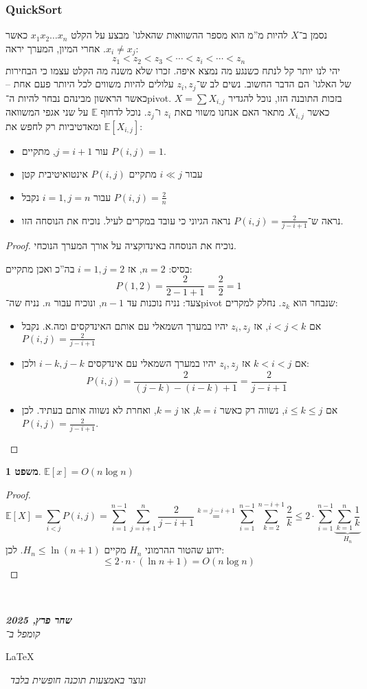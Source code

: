 \documentclass[]{article}
\newcommand\en[1] {\begin{otherlanguage}{english}#1\end{otherlanguage}}
\newcommand\ndoc  {\dotfill \\ \vfil {\begin{center}
            {\textbf{\textit{שחר פרץ, 2025}} \\
                \scriptsize \textit{קומפל ב־}\en{\LaTeX}\,\textit{ ונוצר באמצעות תוכנה חופשית בלבד}}
    \end{center}} \vfil	}
\newcommand\E     {\mathbb{E}}
\newcommand\logn  {\log n}
\newtheorem{Theorem}{משפט}
\theoremstyle{definition}
\newcommand\theo  [1] {\begin{Theorem}#1\end{Theorem}}
\begin{document}
    \subsubsection*{QuickSort}
    נסמן ב־$X$ להיות מ''מ הוא מספר ההשוואות שהאלגו' מבצע על הקלט $x_1x_2 \dots x_n$ כאשר $x_i \neq x_j$. אחרי המיון, המערך יראה: 
    \[ z_1 < z_2 < z_3 < \cdots < z_i < \cdots < z_n \]
    יהי לנו יותר קל לנתח כשנגע מה נמצא איפה. זכרו שלא משנה מה הקלט עצמו כי הבחירות של האלגו' הם הדבר החשוב. נשים לב ש־$z_i, z_j$ עלולים להיות משווים לכל היותר פעם אחת – כאשר הראשון מבינהם נבחר להיות ה־pivot. בזכות התובנה הזו, נוכל להגדיר $X = \sum X_{i, j}$ כאשר $X_{i, j}$ מתאר האם אנחנו משווי םאת $z_i$ ו־$z_j$. נוכל לדחוף $\E$ על שני אגפי המשוואה ומאדטיביות רק לחפש את $\E[X_{i, j}]$: 
    \begin{itemize}
        \item עור $j = i + 1$, מתקיים $P(i, j) = 1$. 
        \item עבור $i \ll j$ מתקיים $P(i, j)$ אינטואיטיבית קטן
        \item עבור $i = 1, j = n$ נקבל $P(i, j) = \frac{2}{n}$
        \item נראה ש־$P(i, j) = \frac{2}{j - i + 1}$ נראה הגיוני כי עובד במקרים לעיל. נוכיח את הנוסחה הזו. 
    \end{itemize}
    \begin{proof}
        נוכיח את הנוסחה באינדוקציה על אורך המערך הנוכחי. 
        
        בסיס: $n = 2$, אז $i = 1, j = 2$ בה''כ ואכן מתקיים: 
        \[ P(1, 2) = \frac{2}{2 - 1 + 1} = \frac{2}{2} = 1 \]
        צעד: נניח נוכנות עד $n - 1$, ונוכיח עבור $n$. נניח שה־pivot שנבחר הוא $z_k$. נחלק למקרים: 
        \begin{itemize}
            \item אם $i < j < k$, אז $z_i, z_j$ יהיו במערך השמאלי עם אותם האינדקסים ומה.א. נקבל $P(i, j) = \frac{2}{j - i + 1}$
            \item אם $k < i< j$ אז $z_i, z_j$ יהיו במערך השמאלי עם אינדקסים $i - k, j - k$ ולכן: 
            \[ P(i, j) = \frac{2}{(j -k) - (i - k) + 1} = \frac{2}{j - i + 1} \]
            \item אם $i \le k \le j$, נשווה רק כאשר $k = i$, או $k = j$, ואחרת לא נשווה אותם בעתיד. לכן $P(i, j) = \frac{2}{j - i + 1}$. 
        \end{itemize}
    \end{proof}
    
    \theo{$\E[x] = O(n \logn)$}\begin{proof}
        \[ \E[X] = \sum_{i < j} P(i, j) = \sum_{i = 1}^{n - 1}\sum_{j = i + 1}^{n}\frac{2}{j - i + 1} \overset{k = j - i + 1}{=} \sum_{i = 1}^{n - 1}\sum_{k = 2}^{n - i + 1} \frac{2}{k} \le 2 \cdot \sum_{i = 1}^{n - 1}\underbrace{\sum_{k = 1}^{n}\frac{1}{k}}_{H_n} \]
        ידוע שהטור ההרמוני $H_n$ מקיים $H_n \le \ln(n + 1)$. לכן: 
        \[ \le 2 \cdot n \cdot (\ln n + 1) = O(n \logn) \]
    \end{proof}
    
    
    
    

    
    
    
    \ndoc
\end{document}
